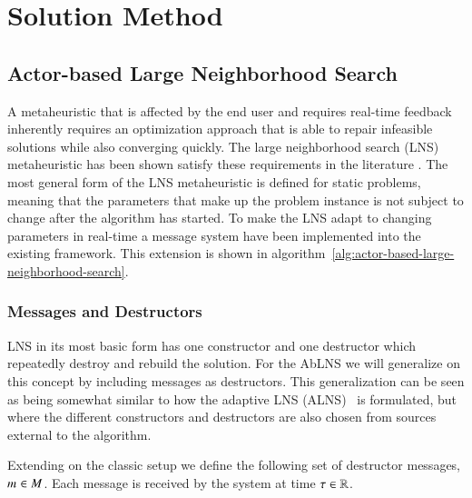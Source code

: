 \section{Solution Method}\label{sec:2-solution-method}

\subsection{Actor-based Large Neighborhood Search} 
A metaheuristic that is affected by the end user and requires real-time
feedback inherently requires an optimization approach that is able to repair
infeasible solutions while also converging quickly. The large neighborhood
search (LNS)~\citep{shaw1998using} metaheuristic has been shown satisfy these
requirements in the literature \citep{gendreauHandbookMetaheuristics2019}.
The most general form of the LNS metaheuristic is defined for static
problems, meaning that the parameters that make up the problem instance
is not subject to change after the algorithm has started. To make the
LNS adapt to changing parameters in real-time a message system have been
implemented into the existing framework. This  extension is shown in 
algorithm~\ref{alg:actor-based-large-neighborhood-search}.

\subsubsection{Messages and Destructors}
LNS in its most basic form has one constructor and one destructor which
repeatedly destroy and rebuild the solution. For the AbLNS we will
generalize on this concept by including messages as destructors. This
generalization can be seen as being somewhat similar to how the adaptive
LNS (ALNS)~\citep{pisinger2007general} is formulated, but where the different
constructors and destructors are also chosen from sources external to the
algorithm.

Extending on the classic setup we define the following set of 
destructor messages, $m_{}^{} \in M$. Each
message is received by the system at time $\tau \in \mathbb{R}$.


